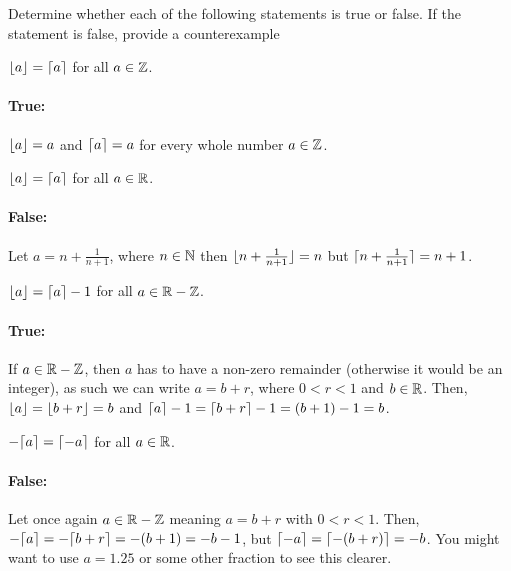 \documentclass[a4paper, english, 12pt]{article} %
\begin{document}
\begin{problem}[8]
  Determine whether each of the following statements is true or false. If the
  statement is false, provide a counterexample
\end{problem}

\begin{subproblem}
  $\lfloor a\rfloor = \lceil a\rceil$ for all $a \in \mathbb{Z}$.
\end{subproblem}

\begin{answer}
  \paragraph{True:} $\lfloor a\rfloor = a$ and $\lceil a\rceil = a$ for every whole number $a
  \in \mathbb{Z}$.
\end{answer}

\begin{subproblem}
  $\lfloor a\rfloor = \lceil a\rceil$ for all $a \in \mathbb{R}$.
\end{subproblem}

\begin{answer}
  \paragraph{False:} Let $a = n + \frac{1}{n+1}$, where $n \in \mathbb{N}$ then
  $\lfloor n + \frac{1}{n+1}\rfloor = n$ but $\lceil n + \frac{1}{n+1}\rceil = n+1$.
\end{answer}

\begin{subproblem}
  $\lfloor a\rfloor = \lceil a\rceil - 1$ for all $a \in \mathbb{R} - \mathbb{Z}$.
\end{subproblem}

\begin{answer}
  \paragraph{True: } If $a \in \mathbb{R} - \mathbb{Z}$, then $a$ has to have a non-zero
  remainder (otherwise it would be an integer), as such we can write $a = b +
  r$, where $0 < r < 1$ and $b \in \mathbb{R}$. Then, $\lfloor a\rfloor = \lfloor b+r\rfloor=b$ and
  $\lceil a\rceil-1 = \lceil b+r\rceil-1 = (b+1)-1 = b$. 
\end{answer}

\begin{subproblem}
  $-\lceil a\rceil = \lceil-a\rceil$ for all $a \in \mathbb{R}$.
\end{subproblem}

\begin{answer}
  \paragraph{False: } Let once again $a \in \mathbb{R} - \mathbb{Z}$ meaning $a = b + r$ with $0
  < r < 1$. Then, $-\lceil a\rceil = -\lceil b+r\rceil = -(b+1)=-b-1$, but
  $\lceil-a\rceil=\lceil-(b+r)\rceil=-b$. You might want to use $a = 1.25$ or some other
  fraction to see this clearer.
\end{answer}
\end{document}
